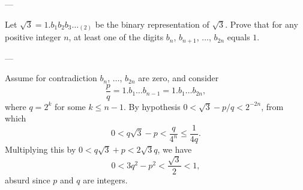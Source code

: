 
---

Let $\sqrt3=1.b_1b_2b_3\ldots_{(2)}$ be the binary representation of $\sqrt3$. Prove that for any positive integer $n$, at least one of the digits $b_n$, $b_{n+1}$, $\ldots$, $b_{2n}$ equals $1$.

---

Assume for contradiction $b_n$, $\ldots$, $b_{2n}$ are zero, and consider \[\frac pq=1.b_1\ldots b_{n-1}=1.b_1\ldots b_{2n},\]
where $q=2^k$ for some $k\le n-1$. By hypothesis $0<\sqrt3-p/q<2^{-2n}$,
from which \[0<q\sqrt3-p<\frac q{4^n}\le\frac1{4q}.\]
Multiplying this by $0<q\sqrt3+p<2\sqrt3q$, we have \[0<3q^2-p^2<\frac{\sqrt3}2<1,\]
absurd since $p$ and $q$ are integers.

